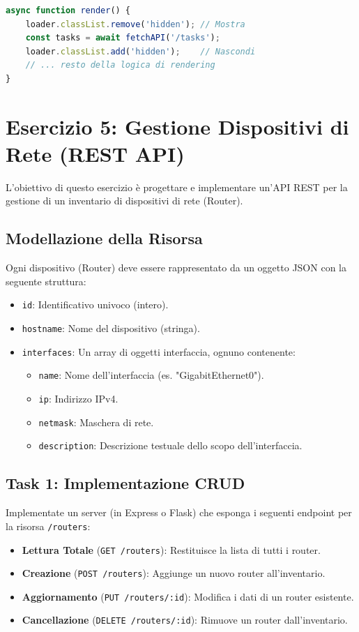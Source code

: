 \documentclass[11pt,a4paper]{article}
\begin{document}
\begin{lstlisting}[language=javascript, caption=Gestione Stato nel Frontend]
async function render() {
    loader.classList.remove('hidden'); // Mostra
    const tasks = await fetchAPI('/tasks');
    loader.classList.add('hidden');    // Nascondi
    // ... resto della logica di rendering
}
\end{lstlisting}
\section{Esercizio 5: Gestione Dispositivi di Rete (REST API)}
L'obiettivo di questo esercizio è progettare e implementare un'API REST per la gestione di un inventario di dispositivi di rete (Router).

\subsection{Modellazione della Risorsa}
Ogni dispositivo (Router) deve essere rappresentato da un oggetto JSON con la seguente struttura:
\begin{itemize}
    \item \texttt{id}: Identificativo univoco (intero).
    \item \texttt{hostname}: Nome del dispositivo (stringa).
    \item \texttt{interfaces}: Un array di oggetti interfaccia, ognuno contenente:
    \begin{itemize}
        \item \texttt{name}: Nome dell'interfaccia (es. "GigabitEthernet0").
        \item \texttt{ip}: Indirizzo IPv4.
        \item \texttt{netmask}: Maschera di rete.
        \item \texttt{description}: Descrizione testuale dello scopo dell'interfaccia.
    \end{itemize}
\end{itemize}

\subsection{Task 1: Implementazione CRUD}
Implementate un server (in Express o Flask) che esponga i seguenti endpoint per la risorsa \texttt{/routers}:
\begin{itemize}
    \item \textbf{Lettura Totale} (\texttt{GET /routers}): Restituisce la lista di tutti i router.
    \item \textbf{Creazione} (\texttt{POST /routers}): Aggiunge un nuovo router all'inventario.
    \item \textbf{Aggiornamento} (\texttt{PUT /routers/:id}): Modifica i dati di un router esistente.
    \item \textbf{Cancellazione} (\texttt{DELETE /routers/:id}): Rimuove un router dall'inventario.
\end{itemize}
\end{document}
